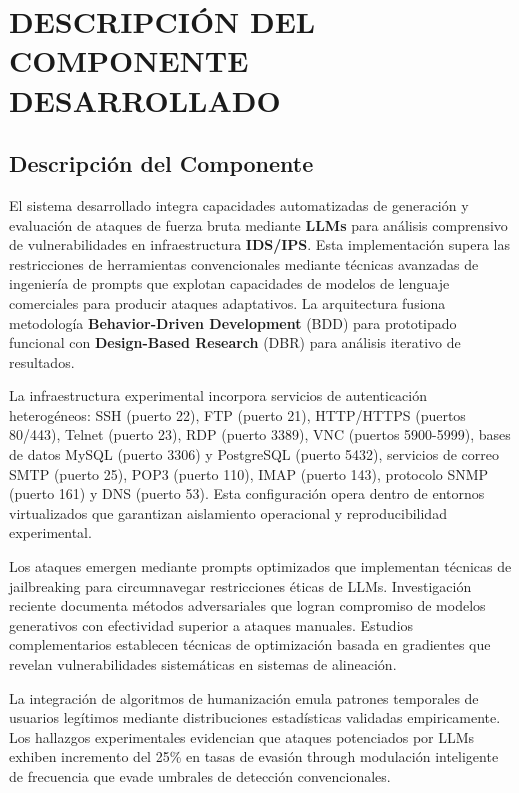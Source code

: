 \chapter{DESCRIPCIÓN DEL COMPONENTE DESARROLLADO}

\section{Descripción del Componente}

El sistema desarrollado integra capacidades automatizadas de generación y evaluación de ataques de fuerza bruta mediante \textbf{LLMs} para análisis comprensivo de vulnerabilidades en infraestructura \textbf{IDS/IPS}. Esta implementación supera las restricciones de herramientas convencionales mediante técnicas avanzadas de ingeniería de prompts que explotan capacidades de modelos de lenguaje comerciales para producir ataques adaptativos. La arquitectura fusiona metodología \textbf{Behavior-Driven Development} (BDD) para prototipado funcional con \textbf{Design-Based Research} (DBR) para análisis iterativo de resultados.

La infraestructura experimental incorpora servicios de autenticación heterogéneos: SSH (puerto 22), FTP (puerto 21), HTTP/HTTPS (puertos 80/443), Telnet (puerto 23), RDP (puerto 3389), VNC (puertos 5900-5999), bases de datos MySQL (puerto 3306) y PostgreSQL (puerto 5432), servicios de correo SMTP (puerto 25), POP3 (puerto 110), IMAP (puerto 143), protocolo SNMP (puerto 161) y DNS (puerto 53). Esta configuración opera dentro de entornos virtualizados que garantizan aislamiento operacional y reproducibilidad experimental.

Los ataques emergen mediante prompts optimizados que implementan técnicas de jailbreaking para circumnavegar restricciones éticas de LLMs. Investigación reciente \cite{Liu2024SneakyPrompt} documenta métodos adversariales que logran compromiso de modelos generativos con efectividad superior a ataques manuales. Estudios complementarios \cite{Wang2024JudgeDeceiver} establecen técnicas de optimización basada en gradientes que revelan vulnerabilidades sistemáticas en sistemas de alineación.

La integración de algoritmos de humanización emula patrones temporales de usuarios legítimos mediante distribuciones estadísticas validadas empiricamente. Los hallazgos experimentales \cite{Rodriguez2024BruteForce} evidencian que ataques potenciados por LLMs exhiben incremento del 25\% en tasas de evasión through modulación inteligente de frecuencia que evade umbrales de detección convencionales.

